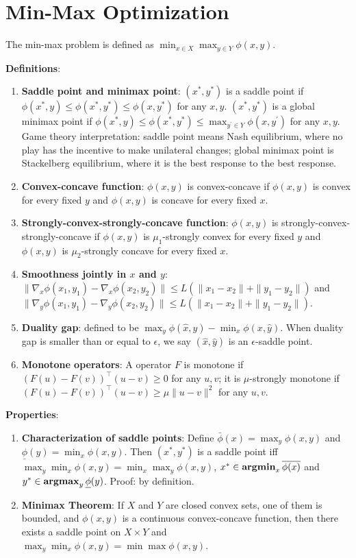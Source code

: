 \section{Min-Max Optimization}

The min-max problem is defined as $\min_{x\in X} \max_{y \in Y} \phi(x,y)$.

\textbf{Definitions}:
\begin{enumerate}
    \item \textbf{Saddle point and minimax point}: $(x^*, y^*)$ is a saddle point if $\phi(x^*, y) \le \phi(x^*, y^*) \le \phi(x, y^*)$ for any $x, y$. $(x^*, y^*)$ is a global minimax point if $\phi(x^*, y) \le \phi(x^*, y^*) \le \max_{y^\prime \in Y} \phi(x, y^\prime)$ for any $x, y$. Game theory interpretation: saddle point means Nash equilibrium, where no play has the incentive to make unilateral changes; global minimax point is Stackelberg equilibrium, where it is the best response to the best response.
    \item \textbf{Convex-concave function}: $\phi(x, y)$ is convex-concave if $\phi(x, y)$ is convex for every fixed $y$ and $\phi(x,y)$ is concave for every fixed $x$.
    \item \textbf{Strongly-convex-strongly-concave function}: $\phi(x, y)$ is strongly-convex-strongly-concave if $\phi(x, y)$ is $\mu_1$-strongly convex for every fixed $y$ and $\phi(x,y)$ is $\mu_2$-strongly concave for every fixed $x$.
    \item \textbf{Smoothness jointly in $x$ and $y$}: $\|\nabla_x \phi(x_1, y_1) - \nabla_x \phi(x_2, y_2)\| \le L(\|x_1 - x_2\| + \|y_1 - y_2\|)$ and $\|\nabla_y \phi(x_1, y_1) - \nabla_y \phi(x_2, y_2)\| \le L(\|x_1 - x_2\| + \|y_1 - y_2\|)$.
    \item \textbf{Duality gap}: defined to be $\max_y \phi(\hat{x}, y) - \min_x \phi(x, \hat{y})$. When duality gap is smaller than or equal to $\epsilon$, we say $(\hat{x}, \hat{y})$ is an $\epsilon$-saddle point.
    \item \textbf{Monotone operators}: A operator $F$ is monotone if $(F(u) - F(v))^\top (u-v) \ge 0$ for any $u,v$; it is $\mu$-strongly monotone if $(F(u) - F(v))^\top (u-v) \ge \mu \|u-v\|^2$ for any $u,v$.
\end{enumerate}

\textbf{Properties}:
\begin{enumerate}
    \item \textbf{Characterization of saddle points}: Define $\bar{\phi}(x) = \max_y \phi(x,y)$ and $\underline{\phi}(y) = \min_x \phi(x,y)$. Then $(x^*, y^*)$ is a saddle point iff $\max_y \min_x \phi(x,y) = \min_x \max_y \phi(x,y)$, $x^* \in \operatorname{\textbf{argmin}}_x \overline{\phi(x)}$ and $y^* \in \operatorname{\textbf{argmax}}_y \underline{\phi}(y)$. Proof: by definition.
    \item \textbf{Minimax Theorem}: If $X$ and $Y$ are closed convex sets, one of them is bounded, and $\phi(x,y)$ is a continuous convex-concave function, then there exists a saddle point on $X \times Y$ and $\max_y \min_x \phi(x, y) = \min \max \phi(x, y)$.
\end{enumerate}

